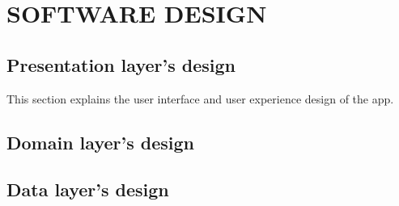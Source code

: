 \chapter{SOFTWARE DESIGN}
\label{chap:design}



\clearpage\newpage
\section{Presentation layer's design}
This section explains the user interface and user experience design of the app.





\clearpage\newpage
\section{Domain layer's design}



\clearpage\newpage
\section{Data layer's design}
\label{sec:database}


